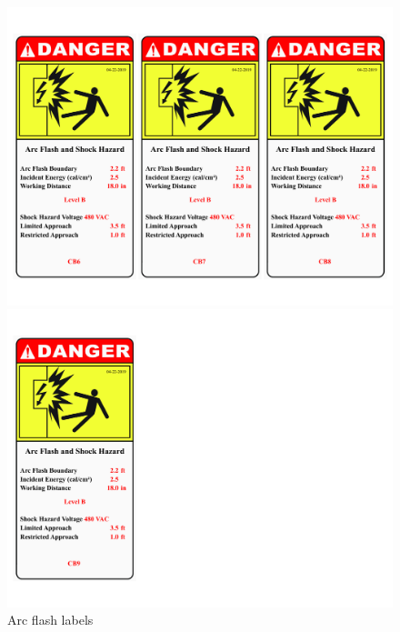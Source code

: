 \begin{figure}
\begin{minipage}[b]{0.5\linewidth}
	\includegraphics[width=\textwidth]{figures/R1P_systemdesign/fig_ch04_elecaudit_arflashlable07}
\end{minipage}
\hspace{0.03cm}
\begin{minipage}[b]{0.45\linewidth}
	\centering
	\includegraphics[width=\textwidth]{figures/R1P_systemdesign/fig_ch04_elecaudit_arflashlable08}
\end{minipage}
	\caption{Arc flash labels}
	\label{fig_ch04_elecaudit_arflashlable} 
\end{figure}